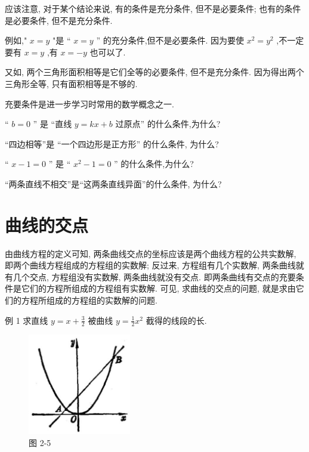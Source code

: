 \documentclass[lang=cn,newtx,10pt,scheme=chinese]{elegantbook}
\begin{document}
应该注意, 对于某个结论来说, 有的条件是充分条件, 但不是必要条件; 也有的条件是必要条件, 但不是充分条件.

例如," \(x = y\) "是 “ \(x = y\) ” 的充分条件,但不是必要条件. 因为要使 \({x}^{2} = {y}^{2}\) ,不一定要有 \(x = y\) ,有 \(x = - y\) 也可以了.

又如, 两个三角形面积相等是它们全等的必要条件, 但不是充分条件. 因为得出两个三角形全等, 只有面积相等是不够的.

充要条件是进一步学习时常用的数学概念之一.

\begin{problemset}[练习]

\item “ \(b = 0\) ” 是 “直线 \(y = {kx} + b\) 过原点” 的什么条件,为什么?

\item “四边相等”是 “一个四边形是正方形” 的什么条件, 为什么?

\item “ \(x - 1 = 0\) ” 是 “ \({x}^{2} - 1 = 0\) ” 的什么条件,为什么?

\item “两条直线不相交”是“这两条直线异面”的什么条件, 为什么?
\end{problemset}

\section{曲线的交点}

由曲线方程的定义可知, 两条曲线交点的坐标应该是两个曲线方程的公共实数解, 即两个曲线方程组成的方程组的实数解; 反过来, 方程组有几个实数解, 两条曲线就有几个交点, 方程组没有实数解, 两条曲线就没有交点. 即两条曲线有交点的充要条件是它们的方程所组成的方程组有实数解. 可见, 求曲线的交点的问题, 就是求由它们的方程所组成的方程组的实数解的问题.

例 1 求直线 \(y = x + \frac{3}{2}\) 被曲线 \(y = \frac{1}{2}{x}^{2}\) 截得的线段的长.

\begin{figure}[h]
  \centering
  \includegraphics[max width=0.4\textwidth]{images/01912cc2-ffb6-728e-9ae7-b113ff05c64b_74_639219.jpg}
  \caption{图 2-5}
\end{figure}
\end{document}
